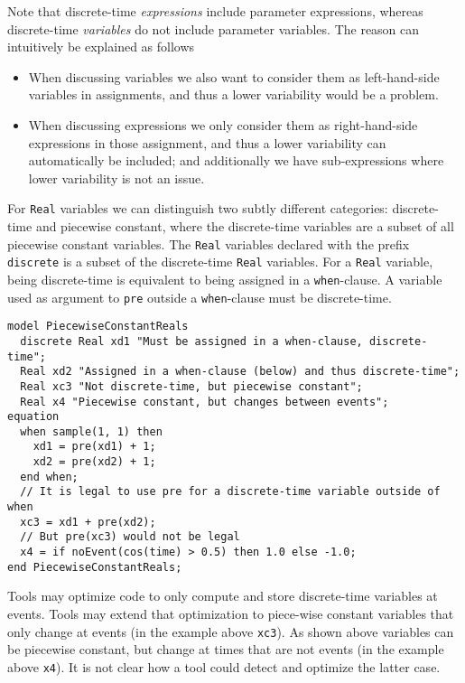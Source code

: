 \begin{nonnormative}
Note that discrete-time \emph{expressions} include parameter expressions, whereas discrete-time \emph{variables} do not include parameter variables.
The reason can intuitively be explained as follows
\begin{itemize}
\item When discussing variables we also want to consider them as left-hand-side variables in assignments, and thus a lower variability would be a problem.
\item When discussing expressions we only consider them as right-hand-side expressions in those assignment, and thus a lower variability can automatically be included; and additionally we have sub-expressions where lower variability is not an issue.
\end{itemize}

For \lstinline!Real! variables we can distinguish two subtly different categories: discrete-time and piecewise constant, where the discrete-time variables are a subset of all piecewise constant variables.
The \lstinline!Real! variables declared with the prefix \lstinline!discrete! is a subset of the discrete-time \lstinline!Real! variables.
For a \lstinline!Real! variable, being discrete-time is equivalent to being assigned in a \lstinline!when!-clause.
A variable used as argument to \lstinline!pre! outside a \lstinline!when!-clause must be discrete-time.

\begin{lstlisting}[language=modelica]
model PiecewiseConstantReals
  discrete Real xd1 "Must be assigned in a when-clause, discrete-time";
  Real xd2 "Assigned in a when-clause (below) and thus discrete-time";
  Real xc3 "Not discrete-time, but piecewise constant";
  Real x4 "Piecewise constant, but changes between events";
equation
  when sample(1, 1) then
    xd1 = pre(xd1) + 1;
    xd2 = pre(xd2) + 1;
  end when;
  // It is legal to use pre for a discrete-time variable outside of when
  xc3 = xd1 + pre(xd2);
  // But pre(xc3) would not be legal
  x4 = if noEvent(cos(time) > 0.5) then 1.0 else -1.0;
end PiecewiseConstantReals;
\end{lstlisting}

Tools may optimize code to only compute and store discrete-time variables at events.
Tools may extend that optimization to piece-wise constant variables that only change at events (in the example above \lstinline!xc3!).
As shown above variables can be piecewise constant, but change at times that are not events (in the example above \lstinline!x4!).
It is not clear how a tool could detect and optimize the latter case.


\end{nonnormative}
